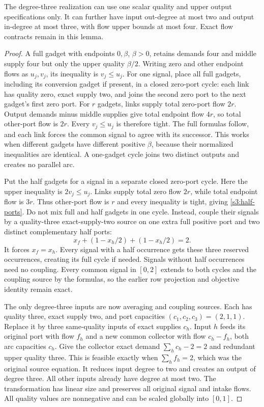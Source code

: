 \begin{lemma}\label{s3:cycles}
The degree-three realization can use one scalar quality and upper output
specifications only. It can further have input out-degree at most two
and output in-degree at most three, with flow upper bounds at most four.
Exact flow contracts remain in this lemma.
\end{lemma}
\begin{proof}
A full gadget with endpoints $0,\beta$, $\beta>0$, retains demands
four and middle supply four but only the upper quality $\beta/2$.
Writing zero and other endpoint flows as $u_j,v_j$, its inequality is
$v_j\le u_j$. For one signal, place all full gadgets, including its
conversion gadget if present, in a closed zero-port cycle: each link
has quality zero, exact supply two, and joins the second zero port to
the next gadget's first zero port. For $r$ gadgets, links supply total
zero-port flow $2r$. Output demands minus middle supplies give total
endpoint flow $4r$, so total other-port flow is $2r$. Every
$v_j\le u_j$ is therefore tight. The full formulas follow, and each
link forces the common signal to agree with its successor. This works
when different gadgets have different positive $\beta$, because their
normalized inequalities are identical. A one-gadget cycle joins two
distinct outputs and creates no parallel arc.

Put the half gadgets for a signal in a separate closed zero-port cycle.
Here the upper inequality is $2v_j\le u_j$. Links supply total zero
flow $2r$, while total endpoint flow is $3r$. Thus other-port flow is
$r$ and every inequality is tight, giving \eqref{s3:half-ports}.
Do not mix full and half gadgets in one cycle. Instead, couple their
signals by a quality-three exact-supply-two source on one extra full
positive port and two distinct complementary half ports:
\[
 x_f+(1-x_h/2)+(1-x_h/2)=2.
\]
It forces $x_f=x_h$. Every signal with a half occurrence gets these
three reserved occurrences, creating its full cycle if needed. Signals
without half occurrences need no coupling. Every common signal in
$[0,2]$ extends to both cycles and the coupling source by the formulas,
so the earlier row projection and objective identity remain exact.

The only degree-three inputs are now averaging and coupling sources.
Each has quality three, exact supply two, and port capacities
$(c_1,c_2,c_3)=(2,1,1)$. Replace it by three same-quality inputs of
exact supplies $c_h$. Input $h$ feeds its original port with flow $f_h$
and a new common collector with flow $c_h-f_h$, both arc capacities
$c_h$. Give the collector exact demand $\sum_hc_h-2=2$ and redundant
upper quality three. This is feasible exactly when $\sum_hf_h=2$,
which was the original source equation. It reduces input degree to two
and creates an output of degree three. All other inputs already have
degree at most two. The transformation has linear size and preserves
all original signal and intake flows. All quality values are nonnegative
and can be scaled globally into $[0,1]$.
\end{proof}

